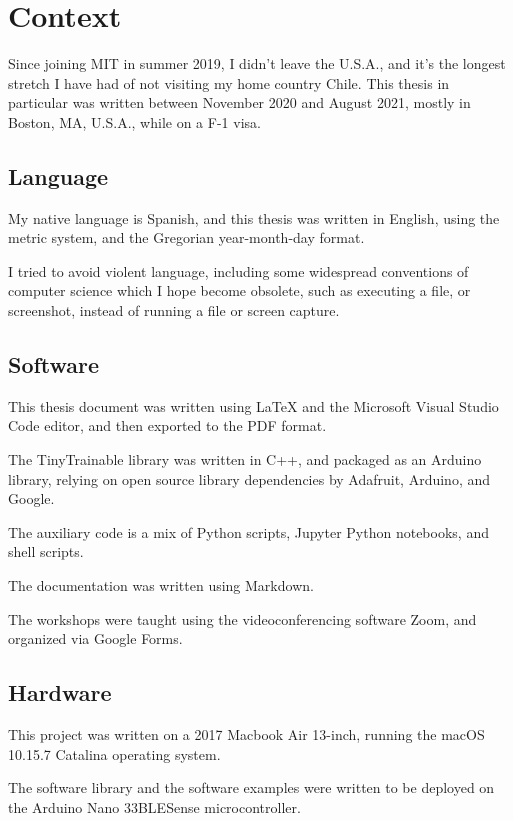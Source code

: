 \chapter{Context}

Since joining MIT in summer 2019, I didn't leave the U.S.A., and it's the longest stretch I have had of not visiting my home country Chile. This thesis in particular was written between November 2020 and August 2021, mostly in Boston, MA, U.S.A., while on a F-1 visa.

\section{Language}

My native language is Spanish, and this thesis was written in English, using the metric system, and the Gregorian year-month-day format.

I tried to avoid violent language, including some widespread conventions of computer science which I hope become obsolete, such as executing a file, or screenshot, instead of running a file or screen capture.

\section{Software}

This thesis document was written using LaTeX and the Microsoft Visual Studio Code editor, and then exported to the PDF format.

The TinyTrainable library was written in C++, and packaged as an Arduino library, relying on open source library dependencies by Adafruit, Arduino, and Google.

The auxiliary code is a mix of Python scripts, Jupyter Python notebooks, and shell scripts.

The documentation was written using Markdown.

The workshops were taught using the videoconferencing software Zoom, and organized via Google Forms.

\section{Hardware}

This project was written on a 2017 Macbook Air 13-inch, running the macOS 10.15.7 Catalina operating system.

The software library and the software examples were written to be deployed on the Arduino Nano 33\acrshort{BLE}Sense microcontroller.

